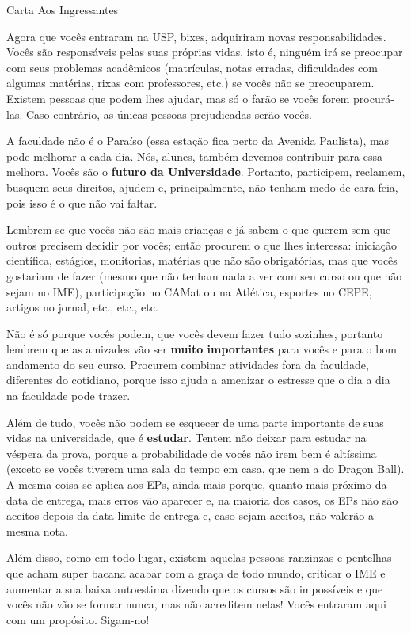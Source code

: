 \begin{editorial}{Carta Aos Ingressantes}

Agora que vocês entraram na USP, bixes, adquiriram novas
responsabilidades. Vocês são responsáveis pelas suas próprias vidas, isto é, 
ninguém irá se preocupar com seus problemas acadêmicos (matrículas, notas erradas,
dificuldades com algumas matérias, rixas com professores, etc.) se vocês não se
preocuparem. Existem pessoas que podem lhes ajudar, mas só o farão se vocês
forem procurá-las. Caso contrário, as únicas pessoas prejudicadas serão vocês.

A faculdade não é o Paraíso (essa estação fica perto da Avenida Paulista), mas pode
melhorar a cada dia. Nós, alunes, também devemos contribuir para essa melhora.
Vocês são o \textbf{futuro da Universidade}. Portanto, participem, reclamem, busquem seus
direitos, ajudem e, principalmente, não tenham medo de cara feia, pois isso é o
que não vai faltar.

Lembrem-se que vocês não são mais crianças e já sabem o que querem sem que
outros precisem decidir por vocês; então procurem o que lhes interessa: iniciação
científica, estágios, monitorias, matérias que não são obrigatórias, mas que
vocês gostariam de fazer (mesmo que não tenham nada a ver com seu curso ou que não
sejam no IME), participação no CAMat ou na Atlética, esportes no CEPE, artigos no
jornal, etc., etc., etc.

Não é só porque vocês podem, que vocês devem fazer tudo sozinhes, portanto lembrem que
as amizades vão ser \textbf{muito importantes} para vocês e para o bom andamento do seu
curso. Procurem combinar atividades fora da faculdade, diferentes do cotidiano,
porque isso ajuda a amenizar o estresse que o dia a dia na faculdade pode
trazer.

Além de tudo, vocês não podem se esquecer de uma parte importante de suas vidas
na universidade, que é \textbf{estudar}. Tentem não deixar para estudar na véspera da
prova, porque a probabilidade de vocês não irem bem é altíssima (exceto se vocês
tiverem uma sala do tempo em casa, que nem a do Dragon Ball). A mesma coisa se
aplica aos EPs, ainda mais porque, quanto mais próximo da data de entrega, mais
erros vão aparecer e, na maioria dos casos, os EPs não são aceitos depois da
data limite de entrega e, caso sejam aceitos, não valerão a mesma nota.

Além disso, como em todo lugar, existem aquelas pessoas ranzinzas e
pentelhas que acham super bacana acabar com a graça de todo mundo,
criticar o IME e aumentar a sua baixa autoestima dizendo que os cursos
são impossíveis e que vocês não vão se formar nunca, mas não acreditem
nelas! Vocês entraram aqui com um propósito. Sigam-no!  


\end{editorial}

